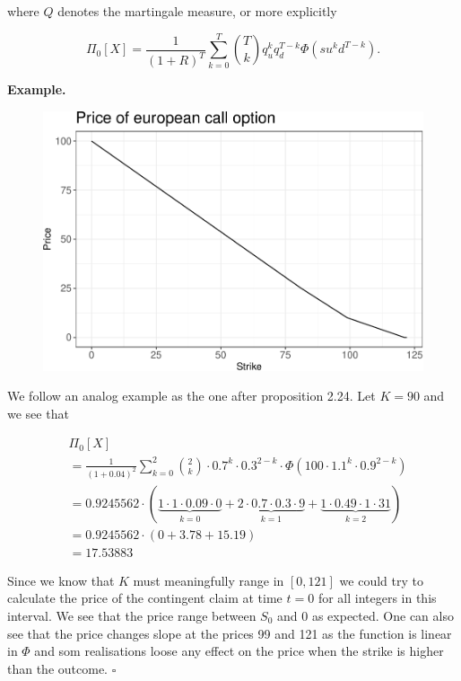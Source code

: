 \documentclass[
]{article}
\begin{document}
where \(Q\) denotes the martingale measure, or more explicitly

\[
\Pi_0[X]=\frac{1}{(1+R)^T}\sum_{k=0}^T\binom{T}{k}q_u^kq_d^{T-k}\Phi(su^kd^{T-k}).
\]

\textbf{Example.}

\begin{figure}\includegraphics{FinKont_homework_files/figure-latex/unnamed-chunk-6-1}\end{figure}

We follow an analog example as the one after proposition 2.24. Let
\(K=90\) and we see that

\begin{align*}
&\Pi_0[X]\\
&=\frac{1}{(1+0.04)^2}\sum_{k=0}^2\binom{2}{k}\cdot0.7^k\cdot0.3^{2-k}\cdot\Phi(100\cdot 1.1^k\cdot0.9^{2-k})\\
&=0.9245562\cdot\left(\underbrace{1\cdot 1\cdot0.09\cdot0}_{k=0}+\underbrace{2\cdot 0.7\cdot0.
3\cdot 9}_{k=1}+\underbrace{1\cdot 0.49\cdot1\cdot31}_{k=2}\right)\\
&=0.9245562\cdot\left(0+3.78+15.19\right)\\
&=17.53883
\end{align*}

Since we know that \(K\) must meaningfully range in \([0,121]\) we could
try to calculate the price of the contingent claim at time \(t=0\) for
all integers in this interval. We see that the price range between
\(S_0\) and 0 as expected. One can also see that the price changes slope
at the prices 99 and 121 as the function is linear in \(\Phi\) and som
realisations loose any effect on the price when the strike is higher
than the outcome. \(\square\)
\end{document}
